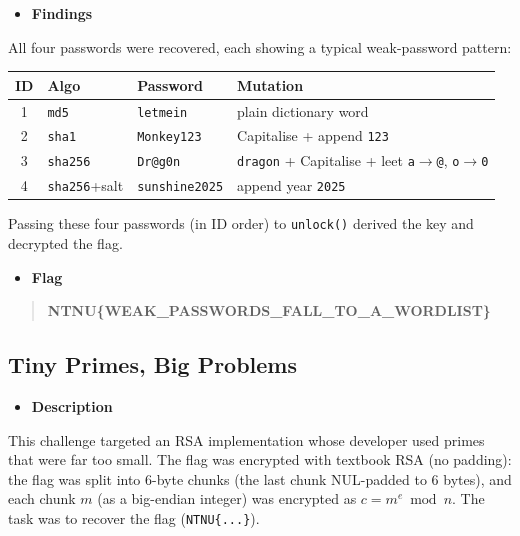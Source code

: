 \documentclass[11pt]{article}
\begin{document}
\begin{itemize}[leftmargin=1.5em]
    \item \textbf{Findings}
\end{itemize}
\noindent All four passwords were recovered, each showing a typical weak-password pattern:

\vspace{0.5em}
\renewcommand{\arraystretch}{1.3}
\noindent
\begin{tabularx}{\linewidth}{|c|l|l|X|}
\hline
\rowcolor{lightgray}\textbf{ID} & \textbf{Algo} & \textbf{Password} & \textbf{Mutation} \\
\hline
1 & \texttt{md5} & \texttt{letmein} & plain dictionary word \\
\hline
2 & \texttt{sha1} & \texttt{Monkey123} & Capitalise + append \texttt{123} \\
\hline
3 & \texttt{sha256} & \texttt{Dr@g0n} & \texttt{dragon} + Capitalise + leet \texttt{a$\rightarrow$@}, \texttt{o$\rightarrow$0} \\
\hline
4 & \texttt{sha256}+salt & \texttt{sunshine2025} & append year \texttt{2025} \\
\hline
\end{tabularx}
\vspace{0.5em}

\noindent Passing these four passwords (in ID order) to \texttt{unlock()} derived the key and decrypted the flag.

\begin{itemize}[leftmargin=1.5em]
    \item \textbf{Flag}
\end{itemize}
\begin{quote}
\textbf{NTNU\{WEAK\_PASSWORDS\_FALL\_TO\_A\_WORDLIST\}}
\end{quote}

\subsection{Tiny Primes, Big Problems}

\begin{itemize}[leftmargin=1.5em]
    \item \textbf{Description}
\end{itemize}
\noindent This challenge targeted an RSA implementation whose developer used primes that were far too small. The flag was encrypted with textbook RSA (no padding): the flag was split into 6-byte chunks (the last chunk NUL-padded to 6 bytes), and each chunk $m$ (as a big-endian integer) was encrypted as $c = m^e \bmod n$. The task was to recover the flag (\texttt{NTNU\{...\}}).
\end{document}

